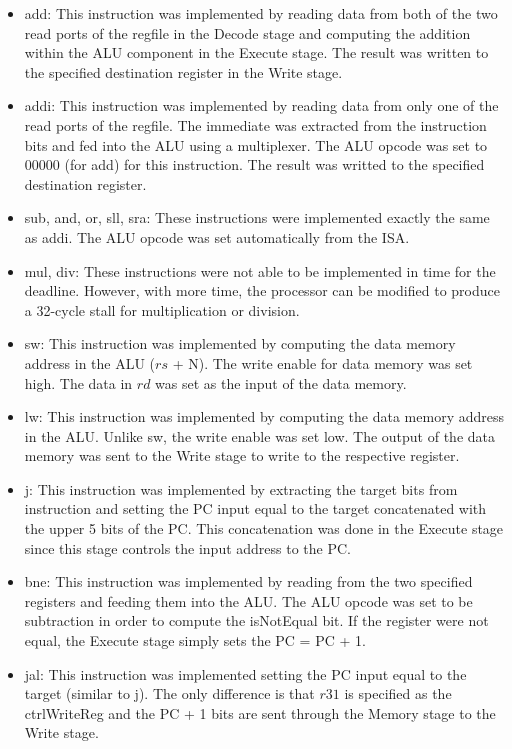 \documentclass[a4paper,11pt]{article}
\begin{document}
\begin{itemize}
    \item add: This instruction was implemented by reading data from both of the two read ports of the regfile in the Decode stage and computing the addition within the ALU component in the Execute stage. The result was written to the specified destination register in the Write stage.
    \item addi: This instruction was implemented by reading data from only one of the read ports of the regfile. The immediate was extracted from the instruction bits and fed into the ALU using a multiplexer. The ALU opcode was set to 00000 (for add) for this instruction. The result was writted to the specified destination register.
    \item sub, and, or, sll, sra: These instructions were implemented exactly the same as addi. The ALU opcode was set automatically from the ISA.
    \item mul, div: These instructions were not able to be implemented in time for the deadline. However, with more time, the processor can be modified to produce a 32-cycle stall for multiplication or division.
    \item sw: This instruction was implemented by computing the data memory address in the ALU ($rs$ + N). The write enable for data memory was set high. The data in $rd$ was set as the input of the data memory.
    \item lw: This instruction was implemented by computing the data memory address in the ALU. Unlike sw, the write enable was set low. The output of the data memory was sent to the Write stage to write to the respective register.
    \item j: This instruction was implemented by extracting the target bits from instruction and setting the PC input equal to the target concatenated with the upper 5 bits of the PC. This concatenation was done in the Execute stage since this stage controls the input address to the PC.
    \item bne: This instruction was implemented by reading from the two specified registers and feeding them into the ALU. The ALU opcode was set to be subtraction in order to compute the isNotEqual bit. If the register were not equal, the Execute stage simply sets the PC = PC + 1.
    \item jal: This instruction was implemented setting the PC input equal to the target (similar to j). The only difference is that $r31$ is specified as the ctrlWriteReg and the PC + 1 bits are sent through the Memory stage to the Write stage.

\end{itemize}
\end{document}
